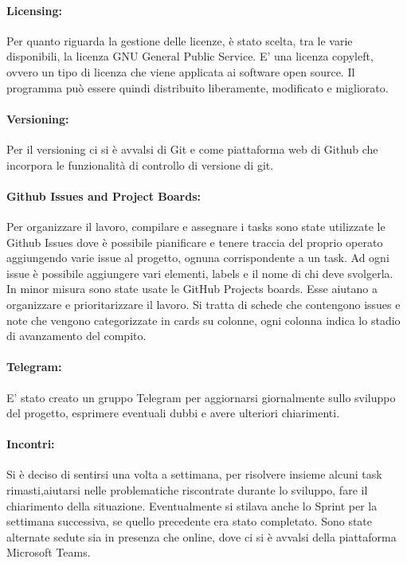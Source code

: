     \paragraph{Licensing: } Per quanto riguarda la gestione delle licenze, è stato scelta, tra le varie disponibili, la licenza GNU General Public Service. E' una licenza copyleft, ovvero un tipo di licenza che viene applicata ai software open source. Il programma può essere quindi distribuito liberamente, modificato e migliorato.
    
    \paragraph{Versioning: }
    Per il versioning ci si è avvalsi di Git e come piattaforma web di Github che incorpora le funzionalità di controllo di versione di git. 
    
    \paragraph{Github Issues and Project Boards: }
    Per organizzare il lavoro, compilare e assegnare i tasks sono state utilizzate le Github Issues dove è possibile pianificare e tenere traccia del proprio operato aggiungendo varie issue al progetto, ognuna corrispondente a un task. Ad ogni issue è possibile aggiungere vari elementi, labels e il nome di chi deve svolgerla.\\ In minor misura sono state usate le GitHub Projects boards. Esse aiutano a organizzare e prioritarizzare il lavoro. Si tratta di schede che contengono issues e note che vengono categorizzate in cards su colonne, ogni colonna indica lo stadio di avanzamento del compito.\\
   
    \paragraph{Telegram: }
    E' stato creato un gruppo Telegram per aggiornarsi giornalmente sullo sviluppo del progetto, esprimere eventuali dubbi e avere ulteriori chiarimenti. 
    
    \paragraph{Incontri: }
    Si è deciso di sentirsi una volta a settimana, per risolvere insieme alcuni task rimasti,aiutarsi nelle problematiche riscontrate durante lo sviluppo, fare il chiarimento della situazione. Eventualmente si stilava anche lo Sprint per la settimana successiva, se quello precedente era stato completato. Sono state alternate sedute sia in presenza che online, dove ci si è avvalsi della piattaforma Microsoft Teams.
    
